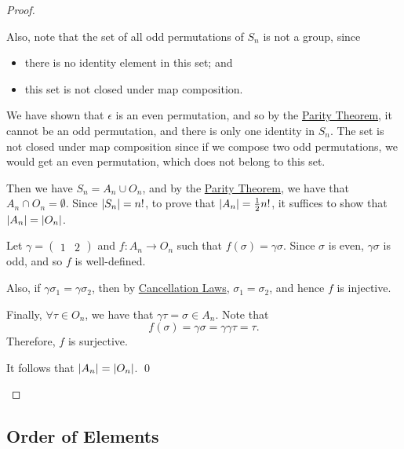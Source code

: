 \documentclass[notoc,notitlepage]{tufte-book}
\begin{document}
\begin{proof}
\begin{enumerate}
{        Also, note that the set of all odd permutations of $S_n$ is not a group, since
        \begin{itemize}
          \item there is no identity element in this set; and
          \item this set is not closed under map composition.
        \end{itemize}
    
        We have shown that $\epsilon$ is an even permutation, and so by the \hyperref[thm:parity_theorem]{Parity Theorem}, it cannot be an odd permutation, and there is only one identity in $S_n$. The set is not closed under map composition since if we compose two odd permutations, we would get an even permutation, which does not belong to this set.
    } Then we have $S_n = A_n \cup O_n$, and by the \hyperref[thm:parity_theorem]{Parity Theorem}, we have that $A_n \cap O_n = \emptyset$. Since $\left|S_n\right| = n!$, to prove that $\left|A_n\right| = \frac{1}{2} n!$, it suffices to show that $\left|A_n\right| = \left|O_n\right|$.
    
    Let $\gamma = \begin{pmatrix} 1 & 2 \end{pmatrix}$ and $f : A_n \to O_n$ such that $f(\sigma) = \gamma \sigma$. Since $\sigma$ is even, $\gamma \sigma$ is odd, and so $f$ is well-defined.
    
    Also, if $\gamma \sigma_1 = \gamma \sigma_2$, then by \hyperref[propo:cancellation_laws]{Cancellation Laws}, $\sigma_1 = \sigma_2$, and hence $f$ is injective.
    
    Finally, $\forall \tau \in O_n$, we have that $\gamma \tau = \sigma \in A_n$. Note that
  \begin{equation*}
    f(\sigma) = \gamma \sigma = \gamma \gamma \tau = \tau.
  \end{equation*}
  Therefore, $f$ is surjective.

  It follows that $\left|A_n\right| = \left|O_n\right|$. \qed
  \end{enumerate}
\end{proof}


\subsection{Order of Elements}
\label{sub:order_of_elements}
\end{document}
